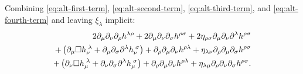 \documentclass[aps,prd,preprint]{revtex4-1}
\begin{document}
Combining \eqref{eq:alt-first-term}, \eqref{eq:alt-second-term}, \eqref{eq:alt-third-term}, and
\eqref{eq:alt-fourth-term} and leaving $\xi_\lambda$ implicit:
\begin{align}
2 \partial_\mu \partial_\nu \partial_\rho h^{\lambda\rho} + 2 \partial_\mu \partial_\nu \partial_\sigma h^{\rho \sigma} +
2 \eta_{\rho \sigma} \partial_\mu \partial_\nu \partial^\lambda h^{\rho\sigma} \notag \\
+ \left(
    \partial_\mu \square h_\nu^{\; \lambda} +
    \partial_\mu \partial_\sigma \partial^\lambda h_\nu^{\; \sigma}
  \right)
  + \partial_\rho \partial_\mu \partial_\nu h^{\rho\lambda}
  + \eta_{\lambda\nu} \partial_\rho \partial_\mu \partial_\sigma h^{\rho\sigma} \notag \\
+ \left(
    \partial_\nu \square h_\mu^{\; \lambda} +
    \partial_\nu \partial_\sigma \partial^\lambda h_\mu^{\; \sigma}
  \right)
  + \partial_\rho \partial_\mu \partial_\nu h^{\rho\lambda}
  + \eta_{\lambda\mu} \partial_\rho \partial_\nu \partial_\sigma h^{\rho\sigma}.
\end{align}
\end{document}
